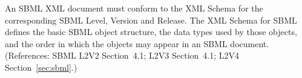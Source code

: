 An SBML XML document must conform to the XML Schema for the corresponding
SBML Level, Version and Release.  The XML Schema for SBML defines the basic
SBML object structure, the data types used by those objects, and the order
in which the objects may appear in an SBML document.  (References: SBML
L2V2 Section~4.1; L2V3 Section~4.1; L2V4 Section~\ref{sec:sbml}.)
